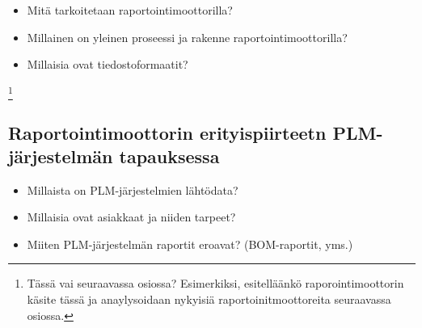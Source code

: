 \begin{itemize}
	\item Mitä tarkoitetaan raportointimoottorilla?
	\item Millainen on yleinen proseessi ja rakenne raportointimoottorilla?
	\item Millaisia ovat tiedostoformaatit?
\end{itemize}\cite{adhi_performance_2019}

\footnote{Tässä vai seuraavassa osiossa? Esimerkiksi, esitelläänkö raporointimoottorin käsite tässä ja anaylysoidaan nykyisiä raportoinitmoottoreita seuraavassa osiossa.}

\subsection{Raportointimoottorin erityispiirteetn PLM-järjestelmän tapauksessa}

\begin{itemize}
	\item Millaista on PLM-järjestelmien lähtödata?
	\item Millaisia ovat asiakkaat ja niiden tarpeet?
	\item Miiten PLM-järjestelmän raportit eroavat? (BOM-raportit, yms.)
\end{itemize}